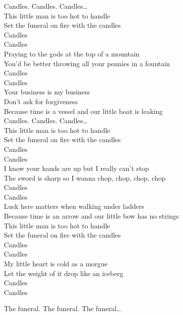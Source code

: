 


Candles. Candles. Candles… \\

This little man is too hot to handle \\
Set the funeral on fire with the candles \\
Candles \\
Candles \\
Praying to the gods at the top of a mountain \\
You'd be better throwing all your pennies in a fountain \\
Candles \\
Candles \\

Your business is my business \\
Don't ask for forgiveness \\
Because time is a vessel and our little boat is leaking \\

Candles. Candles. Candles… \\

This little man is too hot to handle \\
Set the funeral on fire with the candles \\
Candles \\
Candles \\
I know your hands are up but I really can't stop \\
The sword is sharp so I wanna chop, chop, chop, chop \\
Candles \\
Candles \\

Luck here matters when walking under ladders \\
Because time is an arrow and our little bow has no strings \\

This little man is too hot to handle \\
Set the funeral on fire with the candles \\
Candles \\
Candles \\
My little heart is cold as a morgue \\
Let the weight of it drop like an iceberg \\
Candles \\
Candles \\




The funeral. The funeral. The funeral… \\
